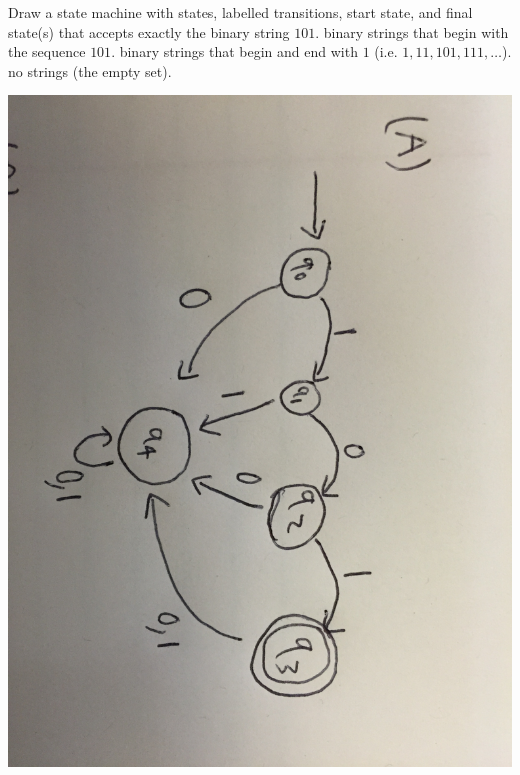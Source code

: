 \documentclass[solution, letterpaper]{cs20inclass}
\begin{document}
\pagebreak

\problem Draw a state machine with states, labelled transitions, start state, and final state(s) that accepts exactly
\subproblem the binary string $101$.
\subproblem binary strings that begin with the sequence $101$.
\subproblem binary strings that begin and end with $1$ (i.e. $1, 11, 101, 111,\ldots$).
\subproblem no strings (the empty set).

\begin{solution}
\includegraphics[width=15cm]{class16p1a}



\end{solution}
\end{document}

